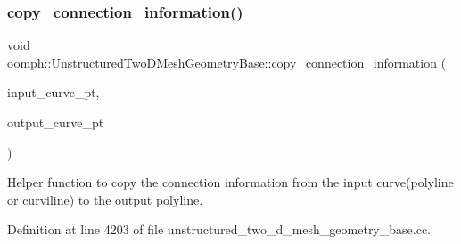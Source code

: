 \mbox{\label{classoomph_1_1UnstructuredTwoDMeshGeometryBase_aa120eef8da13fbd69503ae1087d0dccf}} 
\subsubsection{\texorpdfstring{copy\+\_\+connection\+\_\+information()}{copy\_connection\_information()}}
{\footnotesize\ttfamily void oomph\+::\+Unstructured\+Two\+D\+Mesh\+Geometry\+Base\+::copy\+\_\+connection\+\_\+information (\begin{DoxyParamCaption}\item[{\hyperlink{classoomph_1_1TriangleMeshCurveSection}{Triangle\+Mesh\+Curve\+Section} $\ast$}]{input\+\_\+curve\+\_\+pt,  }\item[{\hyperlink{classoomph_1_1TriangleMeshCurveSection}{Triangle\+Mesh\+Curve\+Section} $\ast$}]{output\+\_\+curve\+\_\+pt }\end{DoxyParamCaption})\hspace{0.3cm}{\ttfamily [protected]}}



Helper function to copy the connection information from the input curve(polyline or curviline) to the output polyline. 



Definition at line 4203 of file unstructured\+\_\+two\+\_\+d\+\_\+mesh\+\_\+geometry\+\_\+base.\+cc.



